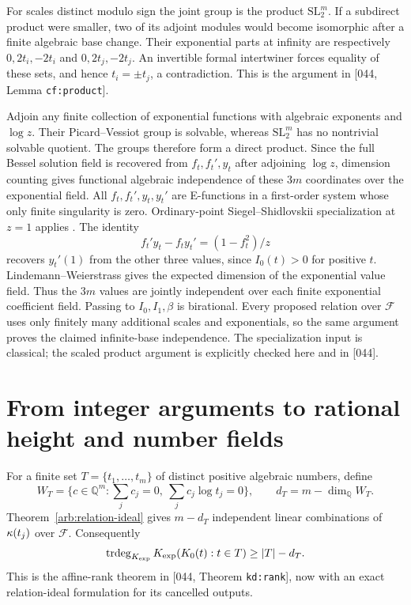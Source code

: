 \documentclass[11pt,a4paper]{article}
\theoremstyle{definition}
\theoremstyle{remark}
\numberwithin{equation}{section}
\begin{document}
For scales distinct modulo sign the joint group is the product
\(\mathrm{SL}_2^m\).  If a subdirect product were smaller, two of
its adjoint modules would become isomorphic after a finite algebraic
base change.  Their exponential parts at infinity are respectively
\(0,2t_i,-2t_i\) and \(0,2t_j,-2t_j\).
An invertible formal intertwiner forces equality of these sets,
and hence \(t_i=\pm t_j\), a contradiction.
This is the argument in [044, Lemma \texttt{cf:product}].

Adjoin any finite collection of exponential functions with algebraic
exponents and \(\log z\).  Their Picard--Vessiot group is solvable,
whereas \(\mathrm{SL}_2^m\) has no nontrivial solvable quotient.
The groups therefore form a direct product.
Since the full Bessel solution field is recovered from
\(f_t,f_t',y_t\) after adjoining \(\log z\), dimension counting
gives functional algebraic independence of these \(3m\) coordinates
over the exponential field.
All \(f_t,f_t',y_t,y_t'\) are E-functions in a first-order system
whose only finite singularity is zero.  Ordinary-point
Siegel--Shidlovskii specialization at \(z=1\) applies
\cite{Beukers2006}.
The identity
\[
 f_t'y_t-f_ty_t'=(1-f_t^2)/z
\]
recovers \(y_t'(1)\) from the other three values, since
\(I_0(t)>0\) for positive \(t\).
Lindemann--Weierstrass gives the expected dimension of the
exponential value field.  Thus the \(3m\) values are jointly
independent over each finite exponential coefficient field.
Passing to \(I_0,I_1,\beta\) is birational.  Every proposed relation
over \(\mathcal F\) uses only finitely many additional scales and
exponentials, so the same argument proves the claimed infinite-base
independence.  The specialization input is classical; the scaled
product argument is explicitly checked here and in [044].

\section{From integer arguments to rational height and number fields}
\label{arb:height}

For a finite set \(T=\{t_1,\ldots,t_m\}\) of distinct positive
algebraic numbers, define
\[
 W_T=\{c\in\mathbb Q^m:
             \sum_jc_j=0,\ \sum_jc_j\log t_j=0\},
 \qquad d_T=m-\dim_{\mathbb Q}W_T.
\]
Theorem~\ref{arb:relation-ideal} gives \(m-d_T\) independent
linear combinations of \(\kappa(t_j)\) over \(\mathcal F\).
Consequently
\begin{equation}\label{arb:Krank}
 \operatorname{trdeg}_{K_{\mathrm{exp}}}
    K_{\mathrm{exp}}(K_0(t):t\in T)\geq |T|-d_T.
\end{equation}
This is the affine-rank theorem in [044, Theorem \texttt{kd:rank}],
now with an exact relation-ideal formulation for its cancelled outputs.
\end{document}
